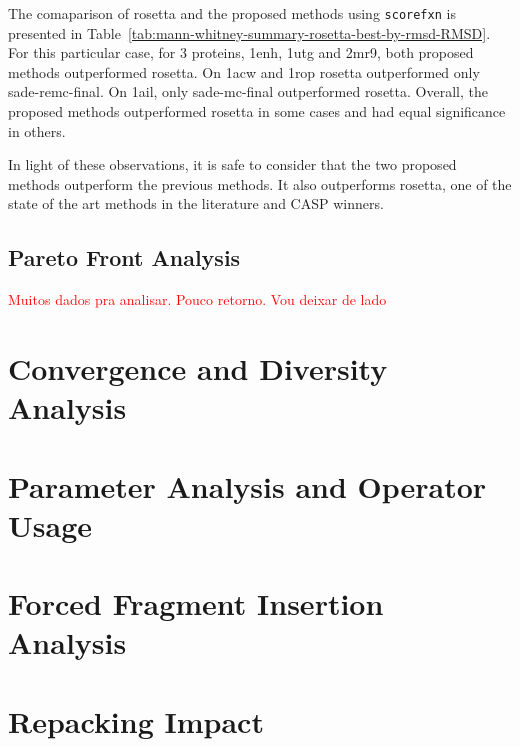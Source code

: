 The comaparison of rosetta and the proposed methods using \texttt{scorefxn}
is presented in Table~\ref{tab:mann-whitney-summary-rosetta-best-by-rmsd-RMSD}.
For this particular case, for 3 proteins, 1enh, 1utg and 2mr9, both proposed
methods outperformed rosetta. On 1acw and 1rop rosetta outperformed only
sade-remc-final. On 1ail, only sade-mc-final outperformed rosetta. Overall,
the proposed methods outperformed rosetta in some cases and had equal
significance in others.

In light of these observations, it is safe to consider that the two proposed
methods outperform the previous methods. It also outperforms rosetta, one of
the state of the art methods in the literature and CASP winners.

\subsection{Pareto Front Analysis}\label{sec:pareto-front-analysis}

\textcolor{red}{Muitos dados pra analisar. Pouco retorno. Vou deixar de lado}



\section{Convergence and Diversity Analysis}

\section{Parameter Analysis and Operator Usage}

\section{Forced Fragment Insertion Analysis}

\section{Repacking Impact}

